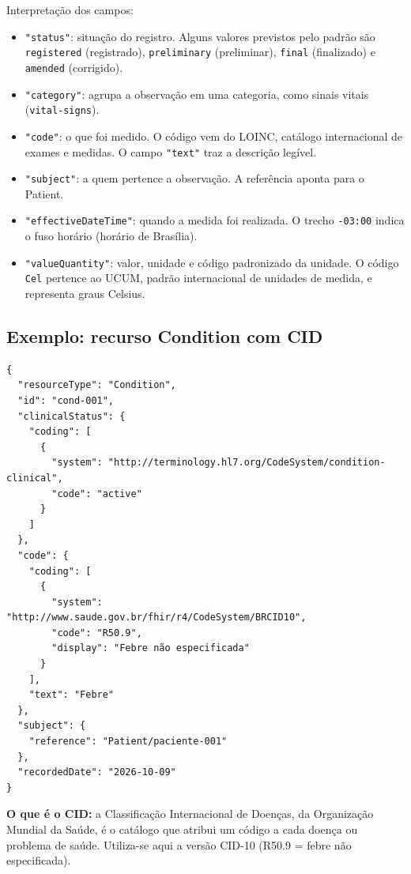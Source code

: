 \documentclass[11pt,a4paper]{article}
\newcommand{\codigo}[1]{\texttt{#1}}
\begin{document}
Interpretação dos campos:

\begin{itemize}
  \item \codigo{"status"}: situação do registro. Alguns valores previstos
    pelo padrão são \codigo{registered} (registrado), \codigo{preliminary}
    (preliminar), \codigo{final} (finalizado) e \codigo{amended}
    (corrigido).
  \item \codigo{"category"}: agrupa a observação em uma categoria, como
    sinais vitais (\codigo{vital-signs}).
  \item \codigo{"code"}: o que foi medido. O código vem do LOINC, catálogo
    internacional de exames e medidas. O campo \codigo{"text"} traz a
    descrição legível.
  \item \codigo{"subject"}: a quem pertence a observação. A referência
    aponta para o Patient.
  \item \codigo{"effectiveDateTime"}: quando a medida foi realizada. O
    trecho \codigo{-03:00} indica o fuso horário (horário de Brasília).
  \item \codigo{"valueQuantity"}: valor, unidade e código padronizado da
    unidade. O código \codigo{Cel} pertence ao UCUM, padrão internacional
    de unidades de medida, e representa graus Celsius.
\end{itemize}

\subsection{Exemplo: recurso Condition com CID}

\begin{Verbatim}[frame=single,fontsize=\footnotesize]
{
  "resourceType": "Condition",
  "id": "cond-001",
  "clinicalStatus": {
    "coding": [
      {
        "system": "http://terminology.hl7.org/CodeSystem/condition-clinical",
        "code": "active"
      }
    ]
  },
  "code": {
    "coding": [
      {
        "system": "http://www.saude.gov.br/fhir/r4/CodeSystem/BRCID10",
        "code": "R50.9",
        "display": "Febre não especificada"
      }
    ],
    "text": "Febre"
  },
  "subject": {
    "reference": "Patient/paciente-001"
  },
  "recordedDate": "2026-10-09"
}
\end{Verbatim}

\textbf{O que é o CID:} a Classificação Internacional de Doenças, da
Organização Mundial da Saúde, é o catálogo que atribui um código a cada
doença ou problema de saúde. Utiliza-se aqui a versão CID-10 (R50.9 =
febre não especificada).
\end{document}
